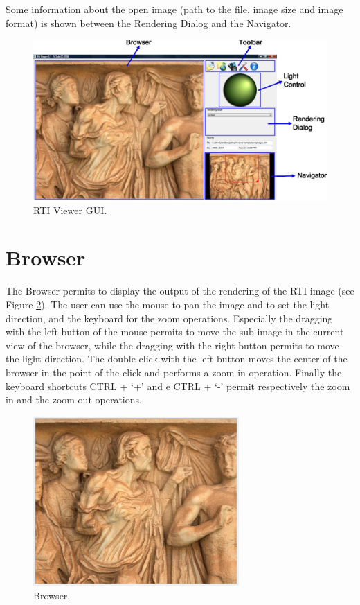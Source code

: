 \documentclass[oneside, 11pt]{book}
\begin{document}
Some information about the open image (path to the file, image size and image format) is shown between the Rendering Dialog and the Navigator.

\begin{figure}[htbp!]
  \centering
  \includegraphics[width=\textwidth]{rtiviewer}
  \caption{RTI Viewer GUI.}
  \label{fig:rtiviewer}
\end{figure}

\section{Browser}
The Browser permits to display the output of the rendering of the RTI image (see Figure \ref{fig:browser}). The user can use the mouse to pan the image and to set the light direction, and the keyboard for the zoom operations. Especially the dragging with the left button of the mouse permits to move the sub-image in the current view of the browser, while the dragging with the right button permits to move the light direction. The double-click with the left button moves the center of the browser in the point of the click and performs a zoom in operation. Finally the keyboard shortcuts CTRL + `+' and e CTRL + `-' permit respectively the zoom in and the zoom out operations.

\begin{figure}[htbp!]
  \centering
  \includegraphics[width=0.7\textwidth]{browser}
  \caption{Browser.}
  \label{fig:browser}
\end{figure}
\end{document}
